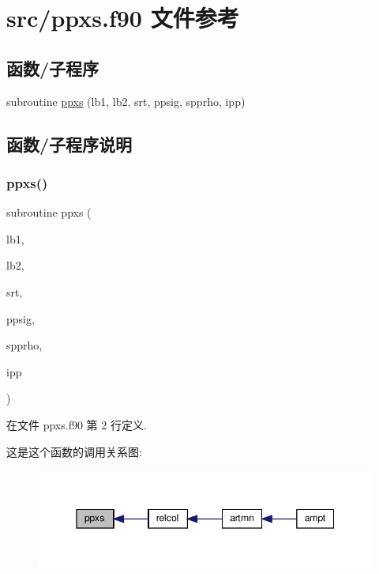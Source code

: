 \hypertarget{ppxs_8f90}{}\section{src/ppxs.f90 文件参考}
\label{ppxs_8f90}
\subsection*{函数/子程序}
\begin{DoxyCompactItemize}
\item 
subroutine \mbox{\hyperlink{ppxs_8f90_a9ca7570707160f0f889cfb1e9593116c}{ppxs}} (lb1, lb2, srt, ppsig, spprho, ipp)
\end{DoxyCompactItemize}


\subsection{函数/子程序说明}
\mbox{\label{ppxs_8f90_a9ca7570707160f0f889cfb1e9593116c}} 
\subsubsection{\texorpdfstring{ppxs()}{ppxs()}}
{\footnotesize\ttfamily subroutine ppxs (\begin{DoxyParamCaption}\item[{}]{lb1,  }\item[{}]{lb2,  }\item[{}]{srt,  }\item[{}]{ppsig,  }\item[{}]{spprho,  }\item[{}]{ipp }\end{DoxyParamCaption})}



在文件 ppxs.\+f90 第 2 行定义.

这是这个函数的调用关系图\+:
\nopagebreak
\begin{figure}[H]
\begin{center}
\leavevmode
\includegraphics[width=345pt]{ppxs_8f90_a9ca7570707160f0f889cfb1e9593116c_icgraph}
\end{center}
\end{figure}
